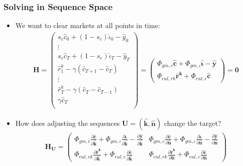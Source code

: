 \documentclass[english,xcolor=svgnames]{beamer}
\begin{document}
\begin{frame}
    \frametitle{Solving in Sequence Space}
		\begin{itemize}
			\item We want to clear markets at all points in time:
			\begin{align*}
				\mathbf{H} = \begin{pmatrix}
					s_c\hat{c}_0 + (1-s_c)\hat{\iota}_0 - \hat{y}_0 \\
					\vdots \\
					s_c\hat{c}_T + (1-s_c)\hat{\iota}_T - \hat{y}_T \\
					 \hat{r}_{1}^k -  \gamma (\hat{c}_{T+1} - \hat{c}_{T})\\
					\vdots \\
					 \hat{r}_{T}^k -  \gamma (\hat{c}_{T} - \hat{c}_{T-1}) \\
					    \gamma  \hat{c}_{T} \\
				\end{pmatrix} = \begin{pmatrix}
					\Phi_{gm,c}\mathbf{\hat{c}} + \Phi_{gm,\iota}\mathbf{\hat{\iota}} - \mathbf{\hat{y}}\\
					\Phi_{eul,rk}\mathbf{\hat{r}^k} + \Phi_{eul,c}\mathbf{\hat{c}}  
				\end{pmatrix} = \mathbf{0}
			\end{align*}
			\item How does adjusting the sequences $\mathbf{U} = (\mathbf{\hat{k}},\mathbf{\hat{n}})$ change the target?
			\begin{align*}
				\mathbf{H}_{\mathbf{U}} = \begin{pmatrix}
					\Phi_{gm,c}\frac{\partial\mathbf{\hat{c}}}{\partial \mathbf{\hat{k}} } + \Phi_{gm,\iota}\frac{\partial\mathbf{\hat{\iota}}}{\partial \mathbf{\hat{k}} } - \frac{\partial\mathbf{\hat{y}}}{\partial \mathbf{\hat{k}} } & \Phi_{gm,c}\frac{\partial\mathbf{\hat{c}}}{\partial \mathbf{\hat{n}} } + \Phi_{gm,\iota}\frac{\partial\mathbf{\hat{\iota}}}{\partial \mathbf{\hat{n}} } - \frac{\partial\mathbf{\hat{y}}}{\partial \mathbf{\hat{n}} }\\
					\Phi_{eul,rk}\frac{\partial\mathbf{\hat{r}^k}}{\partial \mathbf{\hat{k}} } + \Phi_{eul,c}\frac{\partial\mathbf{\hat{c}}}{\partial \mathbf{\hat{k}} } & \Phi_{eul,rk}\frac{\partial\mathbf{\hat{r}^k}}{\partial \mathbf{\hat{n}} } + \Phi_{eul,c}\frac{\partial\mathbf{\hat{c}}}{\partial \mathbf{\hat{n}} } 
				\end{pmatrix}
			\end{align*}
		\end{itemize}
\end{frame}
\end{document}
